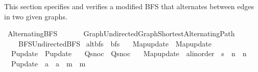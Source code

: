 %
\begin{isabellebody}%
%
%
\isadelimdocument
%
\endisadelimdocument
%
\isatagdocument
%
\isamarkuptrue%
%
\endisatagdocument
{\isafolddocument}%
%
\isadelimdocument
%
\endisadelimdocument
%
\begin{isamarkuptext}%
This section specifies and verifies a modified BFS that alternates between edges in two given graphs.%
\end{isamarkuptext}\isamarkuptrue%
%
\isadelimtheory
%
\endisadelimtheory
%
\isatagtheory
{}\isamarkupfalse%
\ Alternating{\isacharunderscore}{\kern0pt}BFS\isanewline
\ \ \isanewline
\ \ \ \ {\isachardoublequoteopen}{\isachardot}{\kern0pt}{\isachardot}{\kern0pt}{\isacharslash}{\kern0pt}Graph{\isacharslash}{\kern0pt}Undirected{\isacharunderscore}{\kern0pt}Graph{\isacharslash}{\kern0pt}Shortest{\isacharunderscore}{\kern0pt}Alternating{\isacharunderscore}{\kern0pt}Path{\isachardoublequoteclose}\isanewline
\ \ \ \ {\isachardoublequoteopen}{\isachardot}{\kern0pt}{\isachardot}{\kern0pt}{\isacharslash}{\kern0pt}BFS{\isacharslash}{\kern0pt}Undirected{\isacharunderscore}{\kern0pt}BFS{\isachardoublequoteclose}\isanewline
{}%
\endisatagtheory
{\isafoldtheory}%
%
\isadelimtheory
%
\endisadelimtheory
%
\isadelimdocument
%
\endisadelimdocument
%
\isatagdocument
%
\isamarkuptrue%
%
\endisatagdocument
{\isafolddocument}%
%
\isadelimdocument
%
\endisadelimdocument
{}\isamarkupfalse%
\ alt{\isacharunderscore}{\kern0pt}bfs\ {\isacharequal}{\kern0pt}\ bfs\ \isanewline
\ \ Map{\isacharunderscore}{\kern0pt}update\ {\isacharequal}{\kern0pt}\ Map{\isacharunderscore}{\kern0pt}update\ \isanewline
\ \ P{\isacharunderscore}{\kern0pt}update\ {\isacharequal}{\kern0pt}\ P{\isacharunderscore}{\kern0pt}update\ \isanewline
\ \ Q{\isacharunderscore}{\kern0pt}snoc\ {\isacharequal}{\kern0pt}\ Q{\isacharunderscore}{\kern0pt}snoc\ \isanewline
\ \ Map{\isacharunderscore}{\kern0pt}update\ {\isacharcolon}{\kern0pt}{\isacharcolon}{\kern0pt}\ {\isachardoublequoteopen}{\isacharprime}{\kern0pt}a{\isacharcolon}{\kern0pt}{\isacharcolon}{\kern0pt}linorder\ {\isasymRightarrow}\ {\isacharprime}{\kern0pt}s\ {\isasymRightarrow}\ {\isacharprime}{\kern0pt}n\ {\isasymRightarrow}\ {\isacharprime}{\kern0pt}n{\isachardoublequoteclose}\ \isanewline
\ \ P{\isacharunderscore}{\kern0pt}update\ {\isacharcolon}{\kern0pt}{\isacharcolon}{\kern0pt}\ {\isachardoublequoteopen}{\isacharprime}{\kern0pt}a\ {\isasymRightarrow}\ {\isacharprime}{\kern0pt}a\ {\isasymRightarrow}\ {\isacharprime}{\kern0pt}m\ {\isasymRightarrow}\ {\isacharprime}{\kern0pt}m{\isachardoublequoteclose}\ \isanewline

\end{isabellebody}

